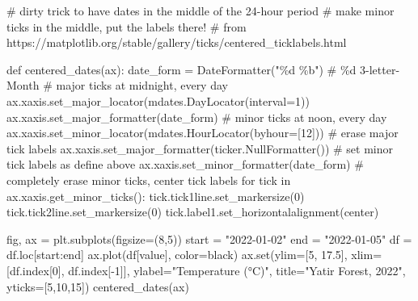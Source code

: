\documentclass[
  letterpaper,
  DIV=11,
  numbers=noendperiod,
  oneside]{scrreprt}
\newenvironment{Shaded}{\begin{snugshade}}{\end{snugshade}}
\newcommand{\BuiltInTok}[1]{\textcolor[rgb]{0.00,0.23,0.31}{#1}}
\newcommand{\CommentTok}[1]{\textcolor[rgb]{0.37,0.37,0.37}{#1}}
\newcommand{\ControlFlowTok}[1]{\textcolor[rgb]{0.00,0.23,0.31}{#1}}
\newcommand{\DecValTok}[1]{\textcolor[rgb]{0.68,0.00,0.00}{#1}}
\newcommand{\FloatTok}[1]{\textcolor[rgb]{0.68,0.00,0.00}{#1}}
\newcommand{\KeywordTok}[1]{\textcolor[rgb]{0.00,0.23,0.31}{#1}}
\newcommand{\NormalTok}[1]{\textcolor[rgb]{0.00,0.23,0.31}{#1}}
\newcommand{\OperatorTok}[1]{\textcolor[rgb]{0.37,0.37,0.37}{#1}}
\newcommand{\SpecialCharTok}[1]{\textcolor[rgb]{0.37,0.37,0.37}{#1}}
\newcommand{\StringTok}[1]{\textcolor[rgb]{0.13,0.47,0.30}{#1}}
\begin{document}
\begin{Shaded}
\begin{Highlighting}[]
\CommentTok{\# dirty trick to have dates in the middle of the 24{-}hour period}
\CommentTok{\# make minor ticks in the middle, put the labels there!}
\CommentTok{\# from https://matplotlib.org/stable/gallery/ticks/centered\_ticklabels.html}

\KeywordTok{def}\NormalTok{ centered\_dates(ax):}
\NormalTok{    date\_form }\OperatorTok{=}\NormalTok{ DateFormatter(}\StringTok{"}\SpecialCharTok{\%d}\StringTok{ \%b"}\NormalTok{)  }\CommentTok{\# \%d 3{-}letter{-}Month}
    \CommentTok{\# major ticks at midnight, every day}
\NormalTok{    ax.xaxis.set\_major\_locator(mdates.DayLocator(interval}\OperatorTok{=}\DecValTok{1}\NormalTok{))}
\NormalTok{    ax.xaxis.set\_major\_formatter(date\_form)}
    \CommentTok{\# minor ticks at noon, every day}
\NormalTok{    ax.xaxis.set\_minor\_locator(mdates.HourLocator(byhour}\OperatorTok{=}\NormalTok{[}\DecValTok{12}\NormalTok{]))}
    \CommentTok{\# erase major tick labels}
\NormalTok{    ax.xaxis.set\_major\_formatter(ticker.NullFormatter())}
    \CommentTok{\# set minor tick labels as define above}
\NormalTok{    ax.xaxis.set\_minor\_formatter(date\_form)}
    \CommentTok{\# completely erase minor ticks, center tick labels}
    \ControlFlowTok{for}\NormalTok{ tick }\KeywordTok{in}\NormalTok{ ax.xaxis.get\_minor\_ticks():}
\NormalTok{        tick.tick1line.set\_markersize(}\DecValTok{0}\NormalTok{)}
\NormalTok{        tick.tick2line.set\_markersize(}\DecValTok{0}\NormalTok{)}
\NormalTok{        tick.label1.set\_horizontalalignment(}\StringTok{\textquotesingle{}center\textquotesingle{}}\NormalTok{)}
\end{Highlighting}
\end{Shaded}

\begin{Shaded}
\begin{Highlighting}[]
\NormalTok{fig, ax }\OperatorTok{=}\NormalTok{ plt.subplots(figsize}\OperatorTok{=}\NormalTok{(}\DecValTok{8}\NormalTok{,}\DecValTok{5}\NormalTok{))}
\NormalTok{start }\OperatorTok{=} \StringTok{"2022{-}01{-}02"}
\NormalTok{end }\OperatorTok{=} \StringTok{"2022{-}01{-}05"}
\NormalTok{df }\OperatorTok{=}\NormalTok{ df.loc[start:end]}
\NormalTok{ax.plot(df[}\StringTok{\textquotesingle{}value\textquotesingle{}}\NormalTok{], color}\OperatorTok{=}\StringTok{\textquotesingle{}black\textquotesingle{}}\NormalTok{)}
\NormalTok{ax.}\BuiltInTok{set}\NormalTok{(ylim}\OperatorTok{=}\NormalTok{[}\DecValTok{5}\NormalTok{, }\FloatTok{17.5}\NormalTok{],}
\NormalTok{       xlim}\OperatorTok{=}\NormalTok{[df.index[}\DecValTok{0}\NormalTok{], df.index[}\OperatorTok{{-}}\DecValTok{1}\NormalTok{]],}
\NormalTok{       ylabel}\OperatorTok{=}\StringTok{"Temperature (°C)"}\NormalTok{,}
\NormalTok{       title}\OperatorTok{=}\StringTok{"Yatir Forest, 2022"}\NormalTok{,}
\NormalTok{       yticks}\OperatorTok{=}\NormalTok{[}\DecValTok{5}\NormalTok{,}\DecValTok{10}\NormalTok{,}\DecValTok{15}\NormalTok{])}
\NormalTok{centered\_dates(ax)}
\end{Highlighting}
\end{Shaded}
\end{document}

